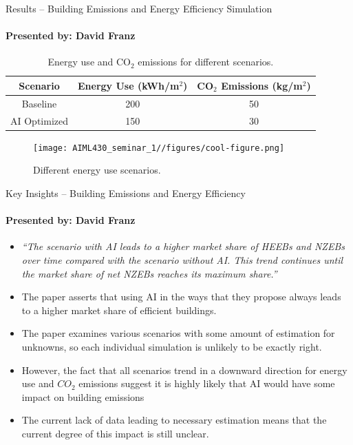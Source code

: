 \documentclass{beamer}
\begin{document}
\begin{frame}{Results – Building Emissions and Energy Efficiency Simulation}
\framesubtitle{Presented by: David Franz}
    \begin{table}
        \centering
        \begin{tabular}{|c|c|c|}
        \hline
        \textbf{Scenario} & \textbf{Energy Use (kWh/m$^2$)} & \textbf{CO$_2$ Emissions (kg/m$^2$)} \\
        \hline 
        Baseline & 200 & 50 \\
        \hline
        AI Optimized & 150 & 30 \\
        \hline
        \end{tabular}
        \caption{Energy use and CO$_2$ emissions for different scenarios.}
        \label{tab:energy-emissions}
    \end{table}
    \begin{figure}
        \centering
        \texttt{[image: AIML430\_seminar\_1//figures/cool-figure.png]}
        \caption{Different energy use scenarios.}
        \label{fig:placeholder}
    \end{figure}
\end{frame}

\begin{frame}{Key Insights – Building Emissions and Energy Efficiency}
\framesubtitle{Presented by: David Franz}
\begin{itemize}
    \item \textit{“The scenario with AI leads to a higher market share of HEEBs and NZEBs over time compared with the scenario without AI. This trend continues until the market share of net NZEBs reaches its maximum share.”}
    \item The paper asserts that using AI in the ways that they propose always leads to a higher market share of efficient buildings. 
    \item The paper examines various scenarios with some amount of estimation for unknowns, so each individual simulation is unlikely to be exactly right. 
    \item However, the fact that all scenarios trend in a downward direction for energy use and $CO_2$ emissions suggest it is highly likely that AI would have some impact on building emissions
    \item The current lack of data leading to necessary estimation means that the current degree of this impact is still unclear.
\end{itemize}
\end{frame}
\end{document}
